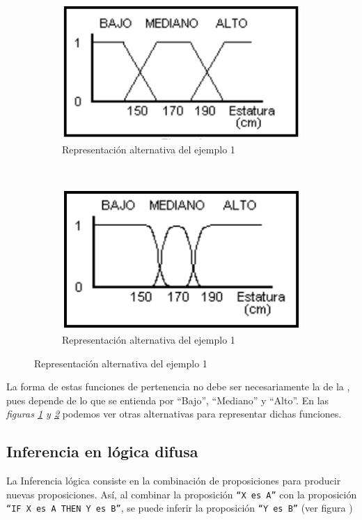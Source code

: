 \begin{figure}[H]
	\centering
	\begin{subfigure}[b]{0.4\textwidth}
		\centering
		\includegraphics[scale = 0.5]{images/fuzzy_example_alt1.png}
		\caption{Representación alternativa del ejemplo 1}
		\label{fig:fuzzy1}
	\end{subfigure}
	~ %
	\begin{subfigure}[b]{0.4\textwidth}
		\centering
		\includegraphics[scale = 0.5]{images/fuzzy_example_alt2.png}
		\caption{Representación alternativa del ejemplo 1}
		\label{fig:fuzzy2}
	\end{subfigure}
	\label{fig:alternativas}	
\end{figure}
La forma de
estas funciones de pertenencia no debe ser necesariamente la de la  ,
pues depende de lo que se entienda por ``Bajo'', ``Mediano'' y ``Alto''.
En las \textit{figuras \ref{fig:fuzzy1} y \ref{fig:fuzzy2}} podemos ver otras alternativas para representar dichas funciones.

\subsection{Inferencia en lógica difusa}
La Inferencia lógica consiste en la combinación de proposiciones para
producir nuevas proposiciones. Así, al combinar la proposición \texttt{``X es A''} con
la proposición \texttt{``IF X es A THEN Y es B''}, se puede inferir la proposición \texttt{``Y es
B''} (ver figura )

